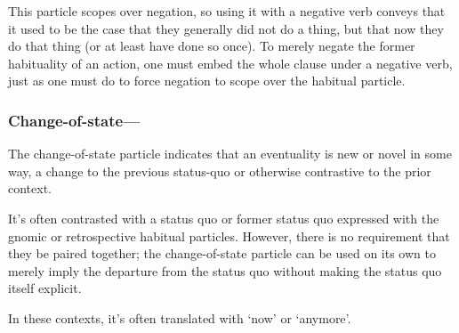 \documentclass[a4paper,11pt,oneside,openany]{memoir}
\begin{document}

This particle scopes over negation, so using it with a negative verb conveys that it used to be the case that they generally did not do a thing, but that now they do that thing (or at least have done so once). To merely negate the former habituality of an action, one must embed the whole clause under a negative verb, just as one must do to force negation to scope over the habitual particle.


\subsubsection{Change-of-state---}

The change-of-state particle %
 indicates that an eventuality is new or novel in some way, a change to the previous status-quo or otherwise contrastive to the prior context.


It's often contrasted with a status quo or former status quo expressed with the gnomic or retrospective habitual particles. However, there is no requirement that they be paired together; the change-of-state particle can be used on its own to merely imply the departure from the status quo without making the status quo itself explicit.


In these contexts, it's often translated with `now' or `anymore'. 
\end{document}
